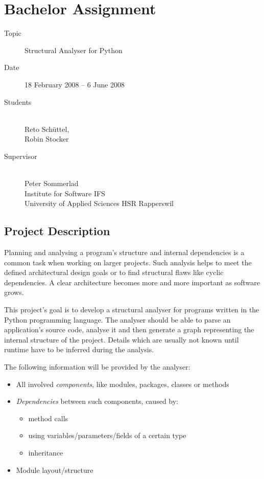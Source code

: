 \documentclass[10pt,halfparskip,DIV15]{scrartcl}
\begin{document}
\pagestyle{empty}

\section*{Bachelor Assignment}

\begin{description}
	\item[Topic] Structural Analyser for Python
	\item[Date] 18 February 2008 – 6 June 2008
	\item[Students] ~ \\
		Reto Schüttel, \\
		Robin Stocker
	\item[Supervisor] ~ \\ 
		Peter Sommerlad \\
		Institute for Software IFS \\
 		University of Applied Sciences HSR Rapperswil

\end{description}

\vspace{-0.5cm}

\subsection*{Project Description}

Planning and analysing a program's structure and internal dependencies is a common task when working on larger projects. Such analysis helps to meet the defined architectural design goals or to find structural flaws like cyclic dependencies. A clear architecture becomes more and more important as software grows.

This project's goal is to develop a structural analyser for programs written in the Python programming language. The analyser should be able to parse an application's source code, analyse it and then generate a graph representing the internal structure of the project. Details which are usually not known until runtime have to be inferred during the analysis.

The following information will be provided by the analyser: 
\begin{itemize}
	\item All involved \emph{components}, like modules, packages, classes or methods
	\item \emph{Dependencies} between such components, caused by:
	\begin{itemize}
		\item method calls
		\item using variables/parameters/fields of a certain type
		\item inheritance
	\end{itemize}
	\item Module layout/structure
\end{itemize}
\end{document}
